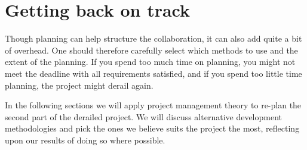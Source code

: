 \section{Getting back on track}
Though planning can help structure the collaboration, it can also add quite a bit of overhead. One should therefore carefully select which methods to use and the extent of the planning. If you spend too much time on planning, you might not meet the deadline with all requirements satisfied, and if you spend too little time planning, the project might derail again.

In the following sections we will apply project management theory to re-plan the second part of the derailed project. We will discuss alternative development methodologies and pick the ones we believe suits the project the most, reflecting upon our results of doing so where possible.






\newpage